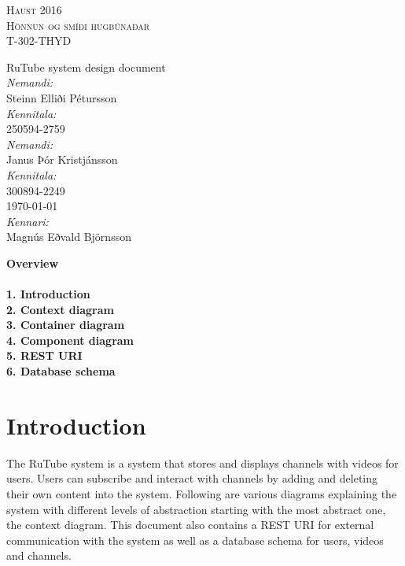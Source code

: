\documentclass[11pt, a4paper]{article}
\begin{document}
\begin{titlepage}
\begin{center}

\textsc{\huge Haust 2016}\\[1.5cm]

\textsc{\huge Hönnun og smíði hugbúnaðar}\\[0.2cm]
\textsc{\huge T-302-THYD}\\[1.5cm]

\end{center}
{ \huge RuTube system design document\\[1.5cm] }
\Large {
\emph{Nemandi:}\\
Steinn Elliði Pétursson\\[0.5cm]
\emph{Kennitala:}\\
250594-2759\\[0.5cm]
\emph{Nemandi:}\\
Janus Þór Kristjánsson\\[0.5cm]
\emph{Kennitala:}\\
300894-2249\\[0.5cm]
{\large \today}\\[0.5cm]
\emph{Kennari:} \\
Magnús Eðvald Björnsson}\\

\end{titlepage}
\leavevmode

\newpage
    {\LARGE \textbf{Overview}}\\~\\
    \textbf{1. Introduction}\\
    \textbf{2. Context diagram}\\
    \textbf{3. Container diagram}\\
    \textbf{4. Component diagram}\\
    \textbf{5. REST URI}\\
    \textbf{6. Database schema}\\
    
\newpage
	\section{Introduction}
		The RuTube system is a system that stores and displays channels with videos for users. Users can subscribe and interact with channels by adding and deleting their own content into the system. Following are various diagrams explaining the system with different levels of abstraction starting with the most abstract one, the context diagram. This document also contains a REST URI for external communication with the system as well as a database schema for users, videos and channels.
\newpage
\end{document}

